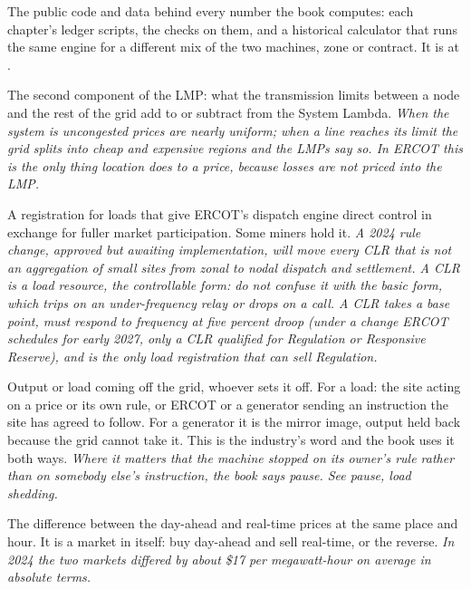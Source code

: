 \begin{description}[leftmargin=0pt,style=unboxed,itemsep=0.35em,parsep=0.15em]
\item[the companion repository] \hypertarget{glossary:the-companion-repository}{}The public code and data behind every number the book computes: each chapter's ledger scripts, the checks on them, and a historical calculator that runs the same engine for a different mix of the two machines, zone or contract. It is at \repourl.
\item[congestion cost] \hypertarget{glossary:congestion-cost}{}The second component of the LMP: what the transmission limits between a node and the rest of the grid add to or subtract from the System Lambda. \emph{When the system is uncongested prices are nearly uniform; when a line reaches its limit the grid splits into cheap and expensive regions and the LMPs say so. In ERCOT this is the only thing location does to a price, because losses are not priced into the LMP.}
\item[Controllable Load Resource (CLR)] \hypertarget{glossary:controllable-load-resource}{}A registration for loads that give ERCOT's dispatch engine direct control in exchange for fuller market participation. Some miners hold it. \emph{A 2024 rule change, approved but awaiting implementation, will move every CLR that is not an aggregation of small sites from zonal to nodal dispatch and settlement. A CLR is a load resource, the controllable form: do not confuse it with the basic form, which trips on an under-frequency relay or drops on a call. A CLR takes a base point, must respond to frequency at five percent droop (under a change ERCOT schedules for early 2027, only a CLR qualified for Regulation or Responsive Reserve), and is the only load registration that can sell Regulation.}
\item[curtailment] \hypertarget{glossary:curtailment}{}Output or load coming off the grid, whoever sets it off. For a load: the site acting on a price or its own rule, or ERCOT or a generator sending an instruction the site has agreed to follow. For a generator it is the mirror image, output held back because the grid cannot take it. This is the industry's word and the book uses it both ways. \emph{Where it matters that the machine stopped on its owner's rule rather than on somebody else's instruction, the book says pause. See pause, load shedding.}
\item[DART spread] \hypertarget{glossary:dart-spread}{}The difference between the day-ahead and real-time prices at the same place and hour. It is a market in itself: buy day-ahead and sell real-time, or the reverse. \emph{In 2024 the two markets differed by about \$17 per megawatt-hour on average in absolute terms.}

\end{description}
